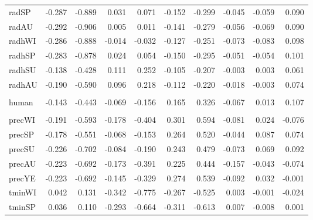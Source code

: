 \begin{table}
\begin{table}[H]
{\begin{tabular}{lrrrrrrrrr}
\hspace{1em}radSP & -0.287 & -0.889 & 0.031 & 0.071 & -0.152 & -0.299 & -0.045 & -0.059 & 0.090\\
\hspace{1em}radAU & -0.292 & -0.906 & 0.005 & 0.011 & -0.141 & -0.279 & -0.056 & -0.069 & 0.090\\
\hspace{1em}radhWI & -0.286 & -0.888 & -0.014 & -0.032 & -0.127 & -0.251 & -0.073 & -0.083 & 0.098\\
\hspace{1em}radhSP & -0.283 & -0.878 & 0.024 & 0.054 & -0.150 & -0.295 & -0.051 & -0.054 & 0.101\\
\hspace{1em}radhSU & -0.138 & -0.428 & 0.111 & 0.252 & -0.105 & -0.207 & -0.003 & 0.003 & 0.061\\
\hspace{1em}radhAU & -0.190 & -0.590 & 0.096 & 0.218 & -0.112 & -0.220 & -0.018 & -0.003 & 0.074\\
\addlinespace[0.3em]
\multicolumn{10}{l}{\textbf{Landscape}}\\
\hspace{1em}human & -0.143 & -0.443 & -0.069 & -0.156 & 0.165 & 0.326 & -0.067 & 0.013 & 0.107\\
\addlinespace[0.3em]
\multicolumn{10}{l}{\textbf{Climate}}\\
\hspace{1em}precWI & -0.191 & -0.593 & -0.178 & -0.404 & 0.301 & 0.594 & -0.081 & 0.024 & -0.076\\
\hspace{1em}precSP & -0.178 & -0.551 & -0.068 & -0.153 & 0.264 & 0.520 & -0.044 & 0.087 & 0.074\\
\hspace{1em}precSU & -0.226 & -0.702 & -0.084 & -0.190 & 0.243 & 0.479 & -0.073 & 0.069 & 0.092\\
\hspace{1em}precAU & -0.223 & -0.692 & -0.173 & -0.391 & 0.225 & 0.444 & -0.157 & -0.043 & -0.074\\
\hspace{1em}precYE & -0.223 & -0.692 & -0.145 & -0.329 & 0.274 & 0.539 & -0.092 & 0.032 & -0.001\\
\hspace{1em}tminWI & 0.042 & 0.131 & -0.342 & -0.775 & -0.267 & -0.525 & 0.003 & -0.001 & -0.024\\
\hspace{1em}tminSP & 0.036 & 0.110 & -0.293 & -0.664 & -0.311 & -0.613 & 0.007 & -0.008 & 0.001\\

\end{tabular}}
\end{table}
\end{table}
